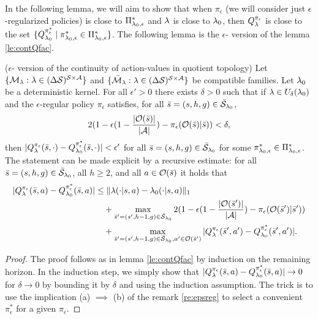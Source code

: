 In the following lemma, we will aim to show that when $\pi_{\epsilon}$ (we will consider just $\epsilon$-regularized policies) is close to $\Pi_{\mathit{\lambda}_0,\epsilon}^*$ and 
$\mathit{\lambda}$ is close to $\mathit{\lambda}_0$, then $Q_{\mathit{\lambda}}^{\pi_{\epsilon}}$ is close to the set $\{Q_{\mathit{\lambda}_0}^{\pi_{\epsilon}^*} \mid \pi_{\mathit{\lambda}_0,\epsilon}^* \in  \Pi_{\mathit{\lambda}_0,\epsilon}^* \}$.
The following lemma is the $\epsilon$-\eUDRL{} version of the lemma \ref{le:contQfac}.
\begin{lemma}
\label{le:econtQfac}
($\epsilon$-\eUDRL{} version of the continuity of action-values in quotient topology)
Let $\{\mathcal{M}_{\mathit{\lambda}} : \mathit{\lambda} \in (\Delta \mathcal{S})^{\mathcal{S}\times\mathcal{A}}\}$
and $\{\bar{\mathcal{M}}_{\mathit{\lambda}} : \mathit{\lambda} \in (\Delta \mathcal{S})^{\mathcal{S}\times\mathcal{A}}\}$ be compatible families.
Let $\mathit{\lambda}_0$ be a deterministic kernel.
For all $\epsilon' >0$ there exists $\delta >0$ such that if $\mathit{\lambda}\in U_{\delta}(\mathit{\lambda}_0)$ and the $\epsilon$-regular policy $\pi_\epsilon$ satisfies,
for 
all $\bar{s}=(s,h,g)\in \bar{\mathcal{S}}_{\mathit{\lambda}_0}$,
$$
2(1-\epsilon(1-\frac{|\mathcal{O}(\bar{s})|}{|\mathcal{A}|})-\pi_{\epsilon}(\mathcal{O}(\bar{s})|\bar{s})) < \delta,
$$
then
$|Q^{\pi_\epsilon}_{\mathit{\lambda}}(\bar{s},\cdot) - Q^{\pi_{\epsilon}^*}_{\mathit{\lambda}_0}(\bar{s},\cdot)| < \epsilon'$ for all $\bar{s}=(s,h,g)\in \bar{\mathcal{S}}_{\mathit{\lambda}_0}$ for some $\pi_{\mathit{\lambda}_0,\epsilon}^* \in \Pi_{\mathit{\lambda}_0,\epsilon}^*$.
The statement can be made explicit by a recursive estimate:
for all $\bar{s} = (s,h,g) \in \bar{\mathcal{S}}_{\mathit{\lambda}_0}$, all $h\geq 2$, and all $a\in \mathcal{O}(\bar{s})$ it holds that
\begin{align*}
|Q_{\mathit{\lambda}}^{\pi_{\epsilon}}(\bar{s},a)-Q_{\mathit{\lambda}_0}^{\pi_{\epsilon}^*}(\bar{s},a) |
&\leq
\|\mathit{\lambda}(\cdot|s,a)-\mathit{\lambda}_0(\cdot|s,a)\|_1
\\
&\quad+
\max_{\bar{s}'=(s',h-1,g) \in\bar{\mathcal{S}}_{\mathit{\lambda}_0}}
2(1-\epsilon(1-\frac{|\mathcal{O}(\bar{s}')|}{|\mathcal{A}|})-\pi_{\epsilon}(\mathcal{O}(\bar{s}')|\bar{s}'))
\\
&\quad+
\max_{\bar{s}'=(s',h-1,g) \in\bar{\mathcal{S}}_{\mathit{\lambda}_0}, a' \in \mathcal{O}(\bar{s}')}
|Q_{\mathit{\lambda}}^{\pi_{\epsilon}}(\bar{s}',a')-Q_{\mathit{\lambda}_0}^{\pi_{\epsilon}^*}(\bar{s}',a')|.
\end{align*}
\end{lemma}

\begin{proof}
The proof follows as in lemma \ref{le:contQfac}
by induction on the remaining horizon.
In the induction step, we simply show that $|Q_{\mathit{\lambda}}^{\pi_{\epsilon}}(\bar{s},a)-Q_{\mathit{\lambda}_0}^{\pi_{\epsilon}^*}(\bar{s},a) | \rightarrow 0$
for $\delta \rightarrow 0$ by bounding it by $\delta$
and using the induction assumption. The trick is to use
the implication (a) $\implies$ (b) of the remark \ref{re:epsreg} to select a
convenient $\pi_{\epsilon}^*$ for a given $\pi_{\epsilon}$.
\end{proof}

